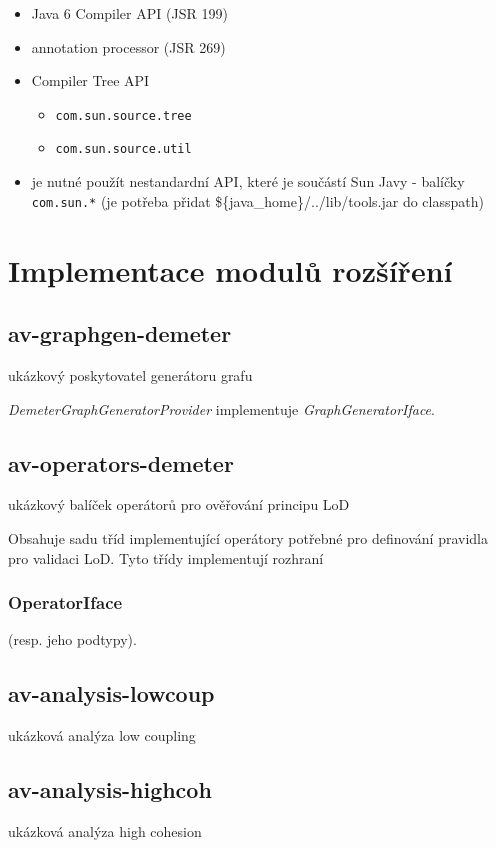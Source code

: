 \begin{itemize}
\item Java 6 Compiler API (JSR 199) \cite{apidoc:java6api}
\item annotation processor (JSR 269)
\item Compiler Tree API
  \begin{itemize}
  \item \verb+com.sun.source.tree+
  \item \verb+com.sun.source.util+
  \end{itemize}
\item je nutné použít nestandardní API, které je součástí Sun Javy - balíčky \verb+com.sun.*+ (je potřeba přidat \$\{java\_home\}/../lib/tools.jar do classpath)
\end{itemize}

\section{Implementace modulů rozšíření}

\subsection{av-graphgen-demeter}
ukázkový poskytovatel generátoru grafu

\emph{DemeterGraphGeneratorProvider} implementuje \emph{GraphGeneratorIface}.

\subsection{av-operators-demeter}
ukázkový balíček operátorů pro ověřování principu LoD

Obsahuje sadu tříd implementující operátory potřebné pro definování pravidla pro validaci LoD. Tyto třídy implementují rozhraní \subsubsection{OperatorIface} (resp. jeho podtypy).

\subsection{av-analysis-lowcoup}
ukázková analýza low coupling

\subsection{av-analysis-highcoh}
ukázková analýza high cohesion

